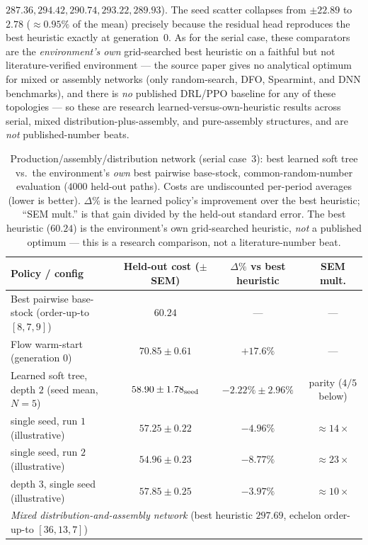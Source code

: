 \documentclass[11pt]{article}
\begin{document}
$287.36,294.42,290.74,293.22,289.93$). The seed scatter collapses from $\pm22.89$ to $2.78$
($\approx0.95\%$ of the mean) precisely because the residual head reproduces the best heuristic exactly at
generation~0. As for the serial case, these comparators are the \emph{environment's own} grid-searched
best heuristic on a faithful but not literature-verified environment --- the source paper gives no
analytical optimum for mixed or assembly networks (only random-search, DFO, Spearmint, and DNN
benchmarks), and there is \emph{no} published DRL/PPO baseline for any of these topologies --- so these
are research learned-versus-own-heuristic results across serial, mixed distribution-plus-assembly, and
pure-assembly structures, and are \emph{not} published-number beats.

\begin{table}[!htbp]
\centering
\small
\caption{Production/assembly/distribution network (serial case~3): best learned soft tree vs.\ the
environment's \emph{own} best pairwise base-stock, common-random-number evaluation ($4000$
held-out paths). Costs are undiscounted per-period averages (lower is better). $\Delta\%$ is the
learned policy's improvement over the best heuristic; ``SEM mult.'' is that gain divided by the held-out
standard error. The best heuristic ($60.24$) is the environment's own grid-searched heuristic, \emph{not} a
published optimum --- this is a research comparison, not a literature-number beat.}
\label{tab:pirhoo-results}
\begin{tabular}{lccc}
\toprule
Policy / config & Held-out cost ($\pm$ SEM) & $\Delta\%$ vs best heuristic & SEM mult. \\
\midrule
Best pairwise base-stock (order-up-to $[8,7,9]$) & $60.24$ & --- & --- \\
Flow warm-start (generation $0$)               & $70.85\pm0.61$ & $+17.6\%$ & --- \\
Learned soft tree, depth $2$ (seed mean, $N=5$) & $58.90\pm1.78_{\rm seed}$ & $-2.22\%\pm2.96\%$ & parity ($4/5$ below) \\
\quad single seed, run $1$ (illustrative)      & $57.25\pm0.22$ & $-4.96\%$ & $\approx 14\times$ \\
\quad single seed, run $2$ (illustrative)      & $54.96\pm0.23$ & $-8.77\%$ & $\approx 23\times$ \\
\quad depth $3$, single seed (illustrative)    & $57.85\pm0.25$ & $-3.97\%$ & $\approx 10\times$ \\
\midrule
\multicolumn{4}{l}{\emph{Mixed distribution-and-assembly network} (best heuristic $297.69$, echelon order-up-to $[36,13,7]$)} \\

\end{tabular}
\end{table}
\end{document}
